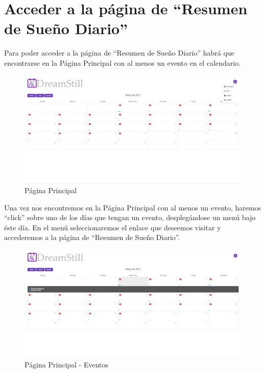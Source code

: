 \documentclass[11pt,openany]{book}
\begin{document}
\pagebreak
\section{Acceder a la página de ``Resumen de Sueño Diario''}

Para poder acceder a la página de ``Resumen de Sueño Diario'' habrá que encontrarse en la Página Principal con al menos un evento en el calendario.

\begin{figure}[H]
\centering
\includegraphics[totalheight=6cm]{manualUsuario/paginaPrincipal.png}
\caption{Página Principal}
\end{figure}

Una vez nos encontremos en la Página Principal con al menos un evento, haremos ``click'' sobre uno de los días que tengan un evento, desplegándose un menú bajo éste día. En el menú seleccionaremos el enlace que deseemos visitar y accederemos a la página de ``Resumen de Sueño Diario''.

\begin{figure}[H]
\centering
\includegraphics[totalheight=6cm]{manualUsuario/eventos.png}
\caption{Página Principal - Eventos}
\end{figure}
\end{document}
